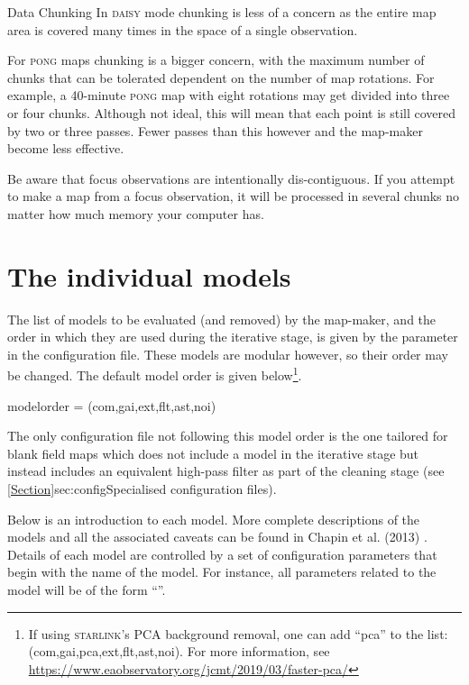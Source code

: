\begin{sltextbox}{Data Chunking}
  In \textsc{daisy} mode chunking is less of a concern as the entire
  map area is covered many times in the space of a single observation.

  For \textsc{pong} maps chunking is a bigger concern, with the
  maximum number of chunks that can be tolerated dependent on the
  number of map rotations. For example, a 40-minute \textsc{pong} map
  with eight rotations may get divided into three or four
  chunks. Although not ideal, this will mean that each point is still
  covered by two or three passes. Fewer passes than this however and
  the map-maker become less effective.

  Be aware that focus observations are intentionally dis-contiguous. If
  you attempt to make a map from a focus observation, it will be
  processed in several chunks no matter how much memory your computer has.
\end{sltextbox}

\section{The individual models}
\label{sec:models}

The list of models to be evaluated (and removed) by the map-maker, and
the order in which they are used during the iterative stage, is given by
the  parameter in the configuration file.
These models are modular however, so their order may be changed. The
default model order is given below\footnote{If using \textsc{starlink}'s PCA background removal, one can add ``pca'' to the list: (com,gai,pca,ext,flt,ast,noi). For more information, see \href{https://www.eaobservatory.org/jcmt/2019/03/faster-pca/}{https://www.eaobservatory.org/jcmt/2019/03/faster-pca/}}.

\begin{terminalv}
modelorder = (com,gai,ext,flt,ast,noi)
\end{terminalv}

The only configuration file not following this model order is the one tailored
for blank field maps which does not include a  model in the
iterative stage but instead includes an equivalent high-pass filter
as part of the cleaning stage (see \cref{Section}{sec:config}{Specialised
configuration files}).

Below is an introduction to each model. More complete descriptions of the
models and all the associated caveats can be found in Chapin et al.
(2013) \cite{mapmaker}. Details of each model are controlled by a set of
configuration parameters that begin with the name of the model. For
instance, all parameters related to the  model will be of the
form ``''.

